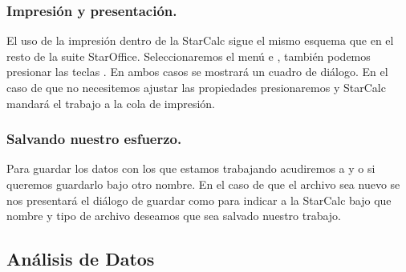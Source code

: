 
\subsubsection{Impresión y presentación.}
El uso de la impresión dentro de la StarCalc sigue el mismo esquema que en el
resto de la suite StarOffice. Seleccionaremos el menú  e
, también podemos presionar las teclas . En
ambos casos se mostrará un cuadro de diálogo. En el caso de que no necesitemos
ajustar las propiedades presionaremos  y StarCalc mandará el
trabajo a la cola de impresión.
 

\subsubsection{Salvando nuestro esfuerzo.} 
Para guardar los datos con los que estamos trabajando acudiremos a
 y  o  si
queremos guardarlo bajo otro nombre. En el caso de que el archivo
sea nuevo se nos presentará el diálogo de guardar como para indicar
a la StarCalc bajo que nombre y tipo de archivo deseamos que sea
salvado nuestro trabajo.


\subsection{Análisis de Datos}
 
